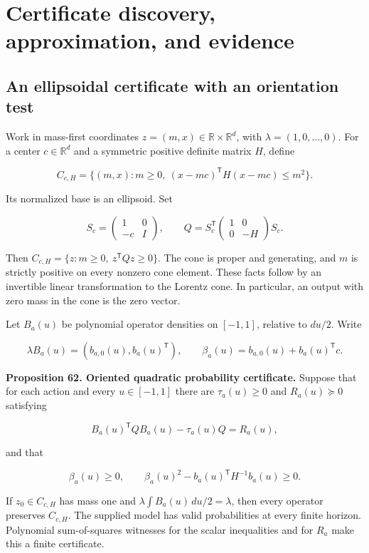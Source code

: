 \chapter{Certificate discovery, approximation, and evidence}\label{LSM:book:chapter-36}
\section{An ellipsoidal certificate with an orientation test}\label{LSM:an-ellipsoidal-certificate-with-an-orientation-test}

Work in mass-first coordinates \(z=(m,x)\in\mathbb R\times\mathbb R^d\),
with \(\lambda=(1,0,\ldots,0)\). For a center \(c\in\mathbb R^d\) and a
symmetric positive definite matrix \(H\), define

\[
C_{c,H}=\{(m,x):m\geq0,\ (x-mc)^{\mathsf T}H(x-mc)\leq m^2\}.
\]

Its normalized base is an ellipsoid. Set

\[
S_c=\begin{pmatrix}1&0\\-c&I\end{pmatrix},\qquad
Q=S_c^{\mathsf T}\begin{pmatrix}1&0\\0&-H\end{pmatrix}S_c.
\]

Then \(C_{c,H}=\{z:m\geq0,\ z^{\mathsf T}Qz\geq0\}\). The cone is proper
and generating, and \(m\) is strictly positive on every nonzero cone
element. These facts follow by an invertible linear transformation to
the Lorentz cone. In particular, an output with zero mass in the cone is
the zero vector.

Let \(B_a(u)\) be polynomial operator densities on \([-1,1]\), relative
to \(du/2\). Write

\[
\lambda B_a(u)=(b_{a,0}(u),b_a(u)^{\mathsf T}),\qquad
\beta_a(u)=b_{a,0}(u)+b_a(u)^{\mathsf T}c.
\]

\textbf{Proposition 62. Oriented quadratic probability certificate.}
Suppose that for each action and every \(u\in[-1,1]\) there are
\(\tau_a(u)\geq0\) and \(R_a(u)\succeq0\) satisfying

\[
\boxed{B_a(u)^{\mathsf T}QB_a(u)-\tau_a(u)Q=R_a(u),}
\]

and that

\[
\boxed{\beta_a(u)\geq0,\qquad
\beta_a(u)^2-b_a(u)^{\mathsf T}H^{-1}b_a(u)\geq0.}
\]

If \(z_0\in C_{c,H}\) has mass one and
\(\lambda\int B_a(u)\,du/2=\lambda\), then every operator preserves
\(C_{c,H}\). The supplied model has valid probabilities at every finite
horizon. Polynomial sum-of-squares witnesses for the scalar inequalities
and for \(R_a\) make this a finite certificate.

